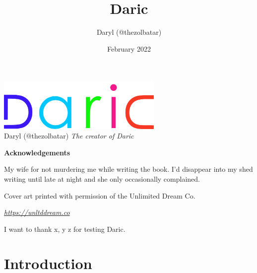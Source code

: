 \documentclass[10pt]{book}
\title{Daric}
\author{Daryl (@thezolbatar)}
\date{February 2022}
\makeatletter
\newcommand{\Daric}{Daric}
\newcommand\ackname{Acknowledgements}
\newenvironment{acknowledgements}{%
      \@beginparpenalty\@lowpenalty
      \begin{center}%
        \bfseries \ackname
      \end{center}}%
\makeatother
\begin{document}
\begin{titlepage}
    \centering
	\includegraphics[width=8cm]{_Logo.png}\\
    \vskip1cm
	\setlength{\fboxrule}{1pt}
    \vskip1cm
    \huge{Daryl (@thezolbatar)}
    \vskip0.25cm
    \normalsize{\emph{The creator of Daric}}
\end{titlepage}
\begin{acknowledgements}
\par{My wife for not murdering me while writing the book. I'd disappear into my shed writing until late at night and she only occasionally complained.}
\par{Cover art printed with permission of the Unlimited Dream Co.}
\begin{center}
\emph{\url{https://unltddream.co}}
\end{center}
\par{I want to thank x, y z for testing \Daric{}.}
\end{acknowledgements}

\tableofcontents

\chapter{Introduction}
\end{document}
